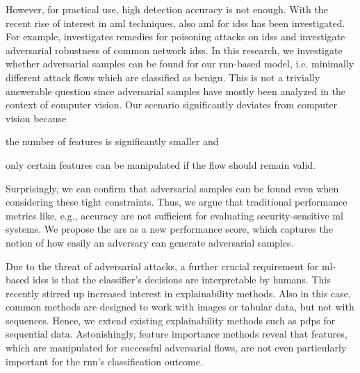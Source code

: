 \documentclass[conference]{IEEEtran}
\begin{document}
However, for practical use, high detection accuracy is not enough. With the recent rise of interest in \gls{aml} techniques, also \gls{aml} for \glspl{ids} has been investigated. For example, \cite{bachl_walling_2019} investigates remedies for poisoning attacks on \glspl{ids} and \cite{hashemi_towards_2019} investigate adversarial robustness of common network \glspl{ids}.
In this research, we investigate whether adversarial samples can be found for our \gls{rnn}-based model, i.e. minimally different attack flows which are classified as benign. This is not a trivially answerable question since adversarial samples have mostly been analyzed in the context of computer vision. Our scenario significantly deviates from computer vision because \begin{enumerate*}
\item the number of features is significantly smaller and
\item only certain features can be manipulated if the flow should remain valid. %
\end{enumerate*}

Surprisingly, we can confirm that adversarial samples can be found even when considering these tight constraints. %
Thus, we argue that traditional performance metrics like, e.g., accuracy are not sufficient for evaluating security-sensitive \gls{ml} systems.
We propose the \acrfull{ars} as a new performance score, which captures the notion of how easily an adversary can generate adversarial samples.

Due to the threat of adversarial attacks, a further crucial requirement for \gls{ml}-based \glspl{ids} is that the classifier's decisions are interpretable by humans. This recently stirred up increased interest in explainability methods. Also in this case, common methods are designed to work with images or tabular data, but not with sequences. Hence, we extend existing explainability methods such as \glspl{pdp} \cite{friedman_greedy_2001} for sequential data. %
Astonishingly, feature importance methods reveal that
features, which are manipulated for successful adversarial flows,
are not even particularly important for the \gls{rnn}'s classification outcome. %
\end{document}
